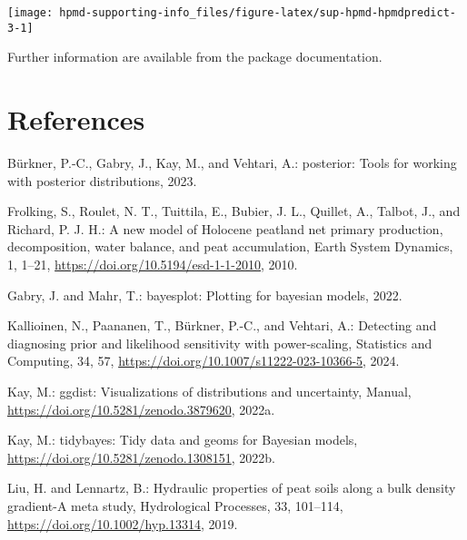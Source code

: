 \documentclass[
  12pt,
]{article}
\newlength{\cslhangindent}
\newlength{\cslentryspacingunit} %
\newenvironment{CSLReferences}[2] %
 {%
  \setlength{\parindent}{0pt}
  \ifodd #1
  \let\oldpar\par
  \def\par{\hangindent=\cslhangindent\oldpar}
  \fi
  \setlength{\parskip}{#2\cslentryspacingunit}
 }%
 {}
\begin{document}
\begin{center}\texttt{[image: hpmd-supporting-info\_files/figure-latex/sup-hpmd-hpmdpredict-3-1]} \end{center}

Further information are available from the package documentation.

\hypertarget{references}{%
\section*{References}\label{references}}

\hypertarget{refs}{}
\begin{CSLReferences}{0}{0}
\leavevmode{}%
Bürkner, P.-C., Gabry, J., Kay, M., and Vehtari, A.: {posterior}: {Tools} for working with posterior distributions, 2023.

\leavevmode{}%
Frolking, S., Roulet, N. T., Tuittila, E., Bubier, J. L., Quillet, A., Talbot, J., and Richard, P. J. H.: A new model of {Holocene} peatland net primary production, decomposition, water balance, and peat accumulation, Earth System Dynamics, 1, 1--21, \url{https://doi.org/10.5194/esd-1-1-2010}, 2010.

\leavevmode{}%
Gabry, J. and Mahr, T.: {bayesplot}: {Plotting} for bayesian models, 2022.

\leavevmode{}%
Kallioinen, N., Paananen, T., Bürkner, P.-C., and Vehtari, A.: Detecting and diagnosing prior and likelihood sensitivity with power-scaling, Statistics and Computing, 34, 57, \url{https://doi.org/10.1007/s11222-023-10366-5}, 2024.

\leavevmode{}%
Kay, M.: {ggdist}: {Visualizations} of distributions and uncertainty, Manual, \url{https://doi.org/10.5281/zenodo.3879620}, 2022a.

\leavevmode{}%
Kay, M.: {tidybayes}: {Tidy} data and geoms for {Bayesian} models, \url{https://doi.org/10.5281/zenodo.1308151}, 2022b.

\leavevmode{}%
Liu, H. and Lennartz, B.: Hydraulic properties of peat soils along a bulk density gradient-{A} meta study, Hydrological Processes, 33, 101--114, \url{https://doi.org/10.1002/hyp.13314}, 2019.


\end{CSLReferences}
\end{document}
